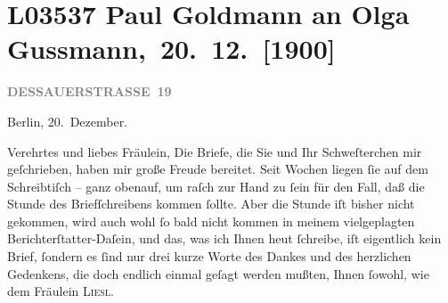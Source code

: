 

\section[ Paul Goldmann an Olga Gussmann, 20. 12. {[}1900{]}]{L03537 Paul Goldmann an Olga Gussmann, 20. 12. {[}1900{]}}
\nopagebreak{}
\rehead{ }\normalsize\beginnumbering{}
\toendnotes[C]{\smallbreak\pagebreak[2]}
\toendnotes[C]{\smallbreak}
\pstart
           \raggedleft{}{\pb}\textcolor{gray}{\textbf{DESSAUERSTRASSE 19}}\pend
           
\pstart
           Berlin, 20. Dezember.\pend
           
\pstart\center{}Verehrtes und liebes Fräulein,\pend\vspace{0.5em}
\pstart
           Die Briefe, die Sie und Ihr Schweſterchen mir geſchrieben, haben mir  große Freude bereitet. Seit Wochen liegen ſie auf dem Schreibtiſch – ganz
               obenauf, um raſch zur Hand zu ſein für den Fall, daß die Stunde des Briefſchreibens
               kommen ſollte. Aber die Stunde iſt bisher nicht gekommen, wird auch wohl ſo bald
               nicht kommen in meinem vielgeplagten Berichterſtatter-Daſein, und das, was ich Ihnen
                  heut ſchreibe, iſt eigentlich kein Brief, ſondern
               es ſind nur drei kurze Worte des Dankes und des herzlichen Gedenkens, die doch
               endlich einmal geſagt werden mußten, Ihnen {\pb}ſowohl,
               wie dem Fräulein \textsc{Liesl}.\pend
           
